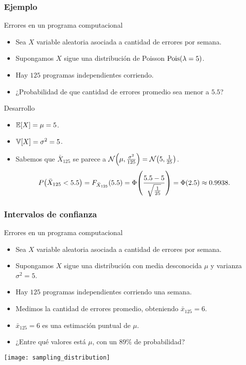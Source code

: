 \documentclass[table]{beamer}
\begin{document}
\begin{frame}
    \frametitle{Ejemplo}
    \begin{block}{Errores en un programa computacional}
        \begin{itemize}
            \item Sea $X$ variable aleatoria asociada a cantidad de errores por semana.
            \item Supongamos $X$ sigue una distribución de Poisson $\poisson{\lambda = 5}$.
            \item Hay $125$ programas independientes corriendo.
            \item ¿Probabilidad de que cantidad de errores promedio sea menor a $5.5$?
        \end{itemize}
    \end{block}
    \begin{block}{Desarrollo}
        \begin{itemize}
            \item $\expected{X} = \mu = 5$.
            \item $\variance{X} = \sigma^{2} = 5$.
            \item Sabemos que $\bar{X}_{125}$ se parece a $\normal{\mu}{\frac{\sigma^{2}}{125}} = \normal{5}{\frac{1}{25}}$.
                \begin{equation*}
                    \prob{\bar{X}_{125} < 5.5} = \pFF{\bar{X}_{125}}{5.5} = \Phi \parens{\frac{5.5 - 5}{\sqrt{\frac{1}{25}}}}
                    = \Phi \parens{2.5} \approx 0.9938
                    .
                \end{equation*}
        \end{itemize}
    \end{block}
\end{frame}

\begin{frame}
    \frametitle{Intervalos de confianza}
    \begin{block}{Errores en un programa computacional}
        \begin{itemize}
            \item Sea $X$ variable aleatoria asociada a cantidad de errores por semana.
            \item Supongamos $X$ sigue una distribución con media desconocida $\mu$ y varianza $\sigma^{2} = 5$.
            \item Hay $125$ programas independientes corriendo una semana.
            \item Medimos la cantidad de errores promedio, obteniendo $\bar{x}_{125} = 6$.
            \item $\bar{x}_{125} = 6$ es una estimación puntual de $\mu$.
            \item ¿Entre qué valores está $\mu$, con un $89\%$ de probabilidad?
        \end{itemize}
    \end{block}
    \begin{center}
        \texttt{[image: sampling\_distribution]}
    \end{center}
\end{frame}
\end{document}
